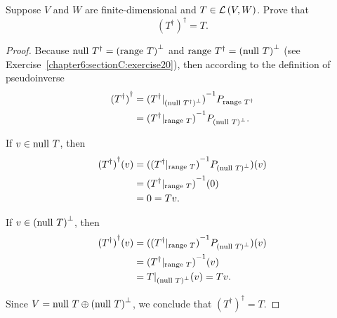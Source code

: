 \begin{exercise}
    Suppose $V$ and $W$ are finite-dimensional and $T\in\mathcal{L}\left({V, W}\right)$. Prove that
    \[
        {(T^{\dagger})}^{\dagger} = T.
    \]
\end{exercise}

\begin{proof}
    Because $\operatorname{null}\,{T^{\dagger}} = {(\operatorname{range}\,{T})}^{\bot}$ and $\operatorname{range}\,{T^{\dagger}} = {(\operatorname{null}\,{T})}^{\bot}$ (see Exercise~\ref{chapter6:sectionC:exercise20}), then according to the definition of pseudoinverse
    \begin{align*}
        {(T^{\dagger})}^{\dagger} & = {(T^{\dagger}\vert_{{(\operatorname{null}\,{T^{\dagger}})}^{\bot}})}^{-1}P_{\operatorname{range}\,{T^{\dagger}}} \\
                                  & = {(T^{\dagger}\vert_{\operatorname{range}\,{T}})}^{-1}P_{{(\operatorname{null}\,{T})}^{\bot}}.
    \end{align*}

    If $v\in \operatorname{null}\,{T}$, then
    \begin{align*}
        {(T^{\dagger})}^{\dagger}(v) & = ({(T^{\dagger}\vert_{\operatorname{range}\,{T}})}^{-1}P_{{(\operatorname{null}\,{T})}^{\bot}})(v) \\
                                     & = {(T^{\dagger}\vert_{\operatorname{range}\,{T}})}^{-1}(0)                            \\
                                     & = 0 = Tv.
    \end{align*}

    If $v\in {(\operatorname{null}\,{T})}^{\bot}$, then
    \begin{align*}
        {(T^{\dagger})}^{\dagger}(v) & = ({(T^{\dagger}\vert_{\operatorname{range}\,{T}})}^{-1}P_{{(\operatorname{null}\,{T})}^{\bot}})(v) \\
                                     & = {(T^{\dagger}\vert_{\operatorname{range}\,{T}})}^{-1}(v)                            \\
                                     & = T\vert_{{(\operatorname{null}\,{T})}^{\bot}}(v) = Tv.
    \end{align*}

    Since $V = \operatorname{null}\,{T}\oplus {(\operatorname{null}\,{T})}^{\bot}$, we conclude that ${(T^{\dagger})}^{\dagger} = T$.
\end{proof}
\newpage
